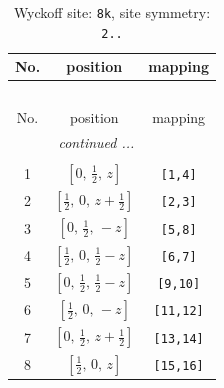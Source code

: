 \documentclass[fleqn,8pt]{jsarticle}
\begin{document}
\renewcommand{\arraystretch}{1.2}
\begin{longtable}{ccc}
\caption{Wyckoff site: {\tt 8k}, site symmetry: {\tt 2..}}
 \\
 \hline \hline
No. & position & mapping \\ \hline \endfirsthead

\multicolumn{2}{l}{\tablename\ \thetable{}} \\
 \hline \hline
No. & position & mapping \\ \hline \endhead

 \hline \hline
\multicolumn{2}{r}{\footnotesize\it continued ...} \\ \endfoot

 \hline \hline
\multicolumn{2}{r}{} \\ \endlastfoot

1 & $\left[ 0,\, \frac{1}{2},\, z \right]$ & {\tt [1,4]} \\ \hline
2 & $\left[ \frac{1}{2},\, 0,\, z + \frac{1}{2} \right]$ & {\tt [2,3]} \\ \hline
3 & $\left[ 0,\, \frac{1}{2},\, - z \right]$ & {\tt [5,8]} \\ \hline
4 & $\left[ \frac{1}{2},\, 0,\, \frac{1}{2} - z \right]$ & {\tt [6,7]} \\ \hline
5 & $\left[ 0,\, \frac{1}{2},\, \frac{1}{2} - z \right]$ & {\tt [9,10]} \\ \hline
6 & $\left[ \frac{1}{2},\, 0,\, - z \right]$ & {\tt [11,12]} \\ \hline
7 & $\left[ 0,\, \frac{1}{2},\, z + \frac{1}{2} \right]$ & {\tt [13,14]} \\ \hline
8 & $\left[ \frac{1}{2},\, 0,\, z \right]$ & {\tt [15,16]} \\
\end{longtable}
\renewcommand{\arraystretch}{1.2}
\end{document}
